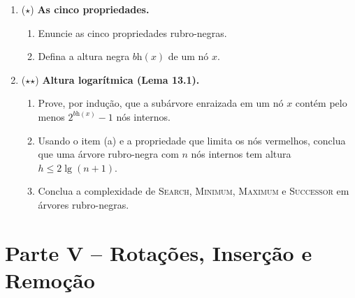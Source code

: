\documentclass[10pt,a4paper]{extarticle}
\newcommand{\impt}[1]{\textcolor{important}{#1}}
\newcommand{\ntc}[1]{\textcolor{notice}{#1}}
\begin{document}
\begin{enumerate}[label=\textbf{\arabic*.}, leftmargin=*, start=10]

\item \ntc{($\star$)} \textbf{As cinco propriedades.}
  \begin{enumerate}[label=(\alph*)]
    \item Enuncie as cinco propriedades rubro-negras.
    \item Defina a \impt{altura negra} $\textit{bh}(x)$ de um nó $x$.
  \end{enumerate}

\item \ntc{($\star$$\star$)} \textbf{Altura logarítmica (Lema 13.1).}
  \begin{enumerate}[label=(\alph*)]
    \item Prove, por indução, que a subárvore enraizada em um nó $x$ contém pelo menos $2^{\textit{bh}(x)} - 1$ nós internos.
    \item Usando o item (a) e a propriedade que limita os nós vermelhos, conclua que uma árvore rubro-negra com $n$ nós internos tem altura $h \le 2\lg(n+1)$.
    \item Conclua a complexidade de \textsc{Search}, \textsc{Minimum}, \textsc{Maximum} e \textsc{Successor} em árvores rubro-negras.
  \end{enumerate}

\end{enumerate}

\section*{Parte V -- Rotações, Inserção e Remoção}
\end{document}
